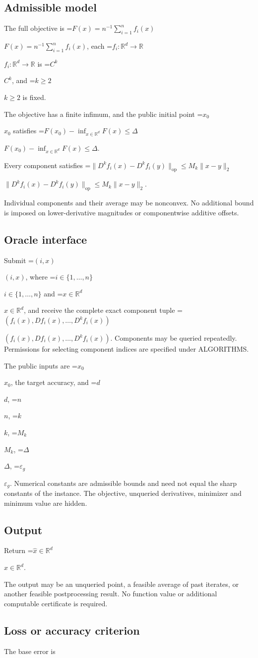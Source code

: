 \documentclass[10pt,a4paper]{article}
\newcommand{\AtlasMath}[1]{\par\begingroup\centering\setbox0=\hbox{$\displaystyle #1$}\ifdim\wd0>1.4\linewidth\typeout{ATLAS WIDE FORMULA: \the\wd0}\fi\ifdim\wd0>\linewidth\resizebox{\linewidth}{!}{\box0}\else\box0\fi\par\endgroup}
\newcommand{\AtlasInlineMath}[1]{\begingroup\setbox0=\hbox{$#1$}\ifdim\wd0>.4\linewidth\endgroup\AtlasMath{#1}\else\endgroup$#1$\fi}
\begin{document}
\subsection{Admissible model}
The full objective is \AtlasInlineMath{F(x)=n^{-1}\sum_{i=1}^n f_i(x)}, each \AtlasInlineMath{f_i:\mathbb{R}^d\to\mathbb{R}} is \AtlasInlineMath{C^k}, and \AtlasInlineMath{k\ge2} is fixed.

The objective has a finite infimum, and the public initial point \AtlasInlineMath{x_0} satisfies \AtlasInlineMath{F(x_0)-\inf_{x\in \mathbb{R}^d}F(x)\le\Delta}.

Every component satisfies \AtlasInlineMath{\|D^kf_i(x)-D^kf_i(y)\|_{\mathrm{op}}\le M_k\|x-y\|_2}.

Individual components and their average may be nonconvex. No additional bound is imposed on lower-derivative magnitudes or componentwise additive offsets.

\subsection{Oracle interface}
Submit \AtlasInlineMath{(i,x)}, where \AtlasInlineMath{i\in\{1,\ldots,n\}} and \AtlasInlineMath{x\in\mathbb{R}^d}, and receive the complete exact component tuple \AtlasInlineMath{(f_i(x),Df_i(x),\ldots,D^{k}f_i(x))}. Components may be queried repeatedly. Permissions for selecting component indices are specified under ALGORITHMS.

The public inputs are \AtlasInlineMath{x_0}, the target accuracy, and \AtlasInlineMath{d}, \AtlasInlineMath{n}, \AtlasInlineMath{k}, \AtlasInlineMath{M_k}, \AtlasInlineMath{\Delta}, \AtlasInlineMath{\varepsilon_g}. Numerical constants are admissible bounds and need not equal the sharp constants of the instance. The objective, unqueried derivatives, minimizer and minimum value are hidden.

\subsection{Output}
Return \AtlasInlineMath{\widehat{x}\in \mathbb{R}^d}.

The output may be an unqueried point, a feasible average of past iterates, or another feasible postprocessing result. No function value or additional computable certificate is required.

\subsection{Loss or accuracy criterion}
The base error is
\end{document}
